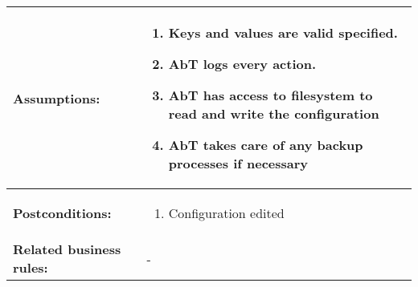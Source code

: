 \newpage
\begin{tabularx}{\linewidth}{|l|X|}
\hline
\textbf{Assumptions:} & \begin{enumerate} 
							\item Keys and values are valid specified.
							\item AbT logs every action.
							\item AbT has access to filesystem to read and write the configuration
							\item AbT takes care of any backup processes if necessary
						\end{enumerate} \\
\hline
\textbf{Postconditions:} & 
  \begin{minipage}{\linewidth}
  \vspace{0.05em}
  \begin{enumerate}
    \item Configuration edited
  \end{enumerate}
  \vspace{0.05em}
\end{minipage}
\\
\hline
\textbf{Related business rules:} & - \\
\hline
\end{tabularx}


